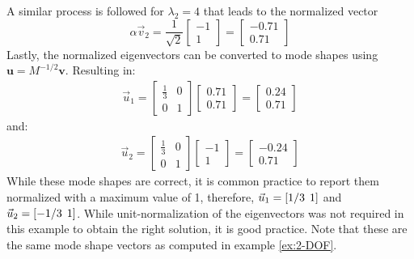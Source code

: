 \documentclass[12pt,letter]{article}
\begin{document}
\begin{example}
	A similar process is followed for $\lambda_2=4$ that leads to the normalized vector 
	\begin{equation}
	\alpha \vec{v}_2=  \frac{1}{\sqrt{2}} \begin{bmatrix} -1 \\ 1 \end{bmatrix} =  \begin{bmatrix} -0.71 \\ 0.71 \end{bmatrix} 
	\end{equation} 
	Lastly, the normalized eigenvectors can be converted to mode shapes using $\textbf{u} = M^{-1/2}\textbf{v}$. Resulting in: 
	\begin{eqnarray}
	\vec{u}_1 =  \begin{bmatrix} \frac{1}{3} & 0  \\  0 & 1 \end{bmatrix}   \begin{bmatrix} 0.71 \\ 0.71 \end{bmatrix} =  \begin{bmatrix} 0.24 \\  0.71 \end{bmatrix}
	\end{eqnarray}
	and:
	\begin{eqnarray}
	\vec{u}_2 =  \begin{bmatrix} \frac{1}{3} & 0  \\  0 & 1 \end{bmatrix}   \begin{bmatrix} -1 \\  1 \end{bmatrix} =  \begin{bmatrix} -0.24 \\  0.71 \end{bmatrix}
	\end{eqnarray}
	While these mode shapes are correct, it is common practice to report them normalized with a maximum value of 1, therefore, $\vec{u}_1 = [1/3 \hspace{1ex} 1]$ and $\vec{u}_2 = [-1/3 \hspace{1ex} 1]$. While unit-normalization of the eigenvectors was not required in this example to obtain the right solution, it is good practice. Note that these are the same mode shape vectors as computed in example \ref{ex:2-DOF}.
	
	\end{example}
	
\end{document}
